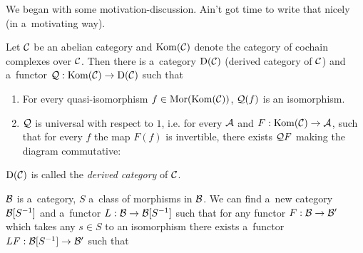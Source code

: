 




	We began with some motivation-discussion. 
	Ain't got time to write that nicely (in a~motivating way).
	
	\begin{theorem}
		Let $\mathcal{C}$ be an abelian category and $\mathrm{Kom}(\mathcal{C})$ denote the category
		of cochain complexes over $\mathcal{C}$. 
		Then there is a~category ${\mathrm{D}({\mathcal{C}})}$ (derived category of $\mathcal{C}$)
		and a~functor $\mathcal{Q}:\mathrm{Kom}(\mathcal{C}) \to {\mathrm{D}({\mathcal{C}})}$
		such that
		\begin{enumerate}
			\item For every quasi-isomorphism $f \in \mathrm{Mor}(\mathrm{Kom}(\mathcal{C}))$,
			$\mathcal{Q}(f)$ is an isomorphism.
			
			\item $\mathcal{Q}$ is universal with respect to $1$, i.e.
			for every $\mathcal{A}$ and $F:\mathrm{Kom}(\mathcal{C}) \to \mathcal{A}$, such that
			for every \qi $f$ the map $F(f)$ is invertible,
			there exists $\mathcal{Q} F$ making the diagram commutative:
			

		\end{enumerate}
		
		${\mathrm{D}({\mathcal{C}})}$ is called the \emph{derived category} of $\mathcal{C}$.
	\end{theorem}
	
	\begin{definition}
		$\mathcal{B}$ is a~category, $S$ a~class of morphisms in $\mathcal{B}$.
		We can find a~new category $\mathcal{B}[S^{-1}]$ and a~functor
		$L:\mathcal{B} \to \mathcal{B}[S^{-1}]$ such that 
		for any functor $F: \mathcal{B} \to \mathcal{B}'$ which takes any $s \in S$
		to an isomorphism there exists a~functor $LF:\mathcal{B}[S^{-1}] \to \mathcal{B}'$
		such that
		
	\end{definition}
	
